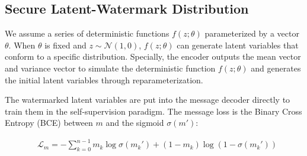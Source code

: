 \subsection{Secure Latent-Watermark Distribution}

We assume a series of deterministic functions $f(z;\theta)$ parameterized by a vector $\theta$. When $\theta$ is fixed and $z \sim \mathcal{N}(1,0)$, $f(z; \theta)$ can generate latent variables that conform to a specific distribution. Specially, the encoder outputs the mean vector and variance vector to simulate the deterministic function $f(z;\theta)$ and generates the initial latent variables through reparameterization. 

The watermarked latent variables are put into the message decoder directly to train them in the self-supervision paradigm. The message loss is the Binary Cross Entropy (BCE) between $m$ and the sigmoid $\sigma(m')$:



\begin{equation}
\begin{aligned}
    &\mathcal{L}_m
    =-\sum_{k=0}^{n-1}m_k\log\sigma(m_k')+(1-m_k)\log(1-\sigma(m_k'))
\end{aligned}
\label{step1_BCE}
\end{equation}



